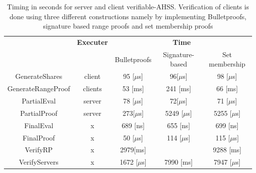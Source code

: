 \begin{table}
\caption{Timing in seconds for server and client verifiable-AHSS. Verification of clients is done using three different constructions namely  by implementing  Bulletproofs, signature based range proofs and set membership proofs}
\centering
\begin{tabular}{*{5}{c}}
\label{tab:BenchBP}
&  \textbf{Executer}   & \multicolumn{3}{c}{\textbf{Time}}   		\\ 
    										& 								& Bulletproofs  & Signature-based & Set membership \\	\hline
  GenerateShares 				&  client  					&   95 [$\mu$s]			 &96[$\mu$s]  &98 [$\mu$s]												\\ \hline 
  GenerateRangeProof  		&  clients  					&   53 [ms]				& 	241 [ms]	&66 [ms]			\\ \hline 
  PartialEval  						&  server  					&   78	[$\mu$s]				&72[$\mu$s]	 		&	71	 [$\mu$s]							\\ \hline 
  PartialProof 					&  server 					&   273[$\mu$s]						& 5249 [$\mu$s]			& 5255 [$\mu$s]				\\ \hline 
  FinalEval  						&  x  							&   689 [ns]						&655  [ns]				&			699  [ns]												\\ \hline 
  FinalProof  						&  x 							&   50	[$\mu$s]			&  114 [$\mu$s]	&				115 [$\mu$s]									\\ \hline 
  VerifyRP							&  x 							&   2979[ms]					&  &					9288 [ms]							\\ \hline 
  VerifyServers					&  x 							&   1672 [$\mu$s]					&		7990 [ms] 	&		7947 [$\mu$s]					\\ \hline 
\end{tabular}
\end{table}
 

